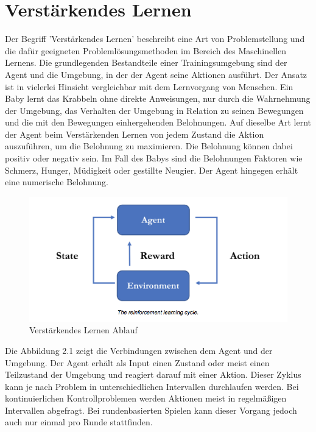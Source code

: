 {\section{Verstärkendes Lernen}}
\label{sec:rl}
Der Begriff 'Verstärkendes Lernen' beschreibt eine Art von Problemstellung und die dafür geeigneten Problemlösungsmethoden im Bereich des Maschinellen Lernens. Die grundlegenden Bestandteile einer Trainingsumgebung sind der Agent und die Umgebung, in der der Agent seine Aktionen ausführt. Der Ansatz ist in vielerlei Hinsicht vergleichbar mit dem Lernvorgang von Menschen. Ein Baby lernt das Krabbeln ohne direkte Anweisungen, nur durch die Wahrnehmung der Umgebung, das Verhalten der Umgebung in Relation zu seinen Bewegungen und die mit den Bewegungen einhergehenden Belohnungen. Auf dieselbe Art lernt der Agent beim Verstärkenden Lernen von jedem Zustand die Aktion auszuführen, um die Belohnung zu maximieren. Die Belohnung können dabei positiv oder negativ sein. Im Fall des Babys sind die Belohnungen Faktoren wie Schmerz, Hunger, Müdigkeit oder gestillte Neugier. Der Agent hingegen erhält eine numerische Belohnung.\cite{sutton2018reinforcement}

\begin{figure}[H]
  \centering  
  \includegraphics[scale=0.5]{img/rl_cycle.png}
  \caption{Verstärkendes Lernen Ablauf \protect\cite{unity_mlagents_rl_cycle}}
  \label{fig:rl_cycle}
\end{figure}

Die Abbildung 2.1 zeigt die Verbindungen zwischen dem Agent und der Umgebung. Der Agent erhält als Input einen Zustand oder meist einen Teilzustand der Umgebung und reagiert darauf mit einer Aktion. Dieser Zyklus kann je nach Problem in unterschiedlichen Intervallen durchlaufen werden. Bei kontinuierlichen Kontrollproblemen werden Aktionen meist in regelmäßigen Intervallen abgefragt. Bei rundenbasierten Spielen kann dieser Vorgang jedoch auch nur einmal pro Runde stattfinden.